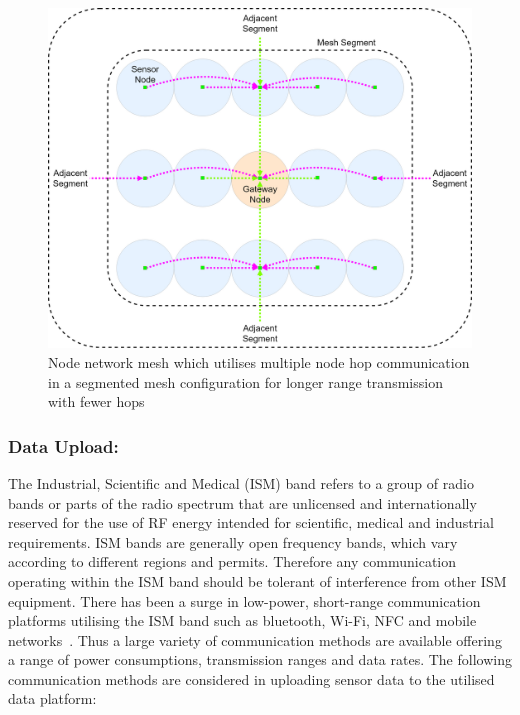 \documentclass[10pt,twocolumn]{witseiepaper}
\begin{document}
			\begin{figure}
				\centering
				\includegraphics[width=1\columnwidth]{media/segment-mesh.png}
				\vspace{1em}
				\caption{Node network mesh which utilises multiple node hop communication in a segmented mesh configuration for longer range transmission with fewer hops}
				\raggedright
				\label{fig:segment}
			\end{figure}
	
		\subsubsection{Data Upload:}
			The Industrial, Scientific and Medical (ISM) band refers to a group of radio bands or parts of the radio spectrum that are unlicensed and internationally reserved for the use of RF energy intended for scientific, medical and industrial requirements. ISM bands are generally open frequency bands, which vary according to different regions and permits. Therefore any communication operating within the ISM band should be tolerant of interference from other ISM equipment. There has been a surge in low-power, short-range communication platforms utilising the ISM band such as bluetooth, Wi-Fi, NFC and mobile networks~\cite{ism}. Thus a large variety of communication methods are available offering a range of power consumptions, transmission ranges and data rates. The following communication methods are considered in uploading sensor data to the utilised data platform:
			
\end{document}

